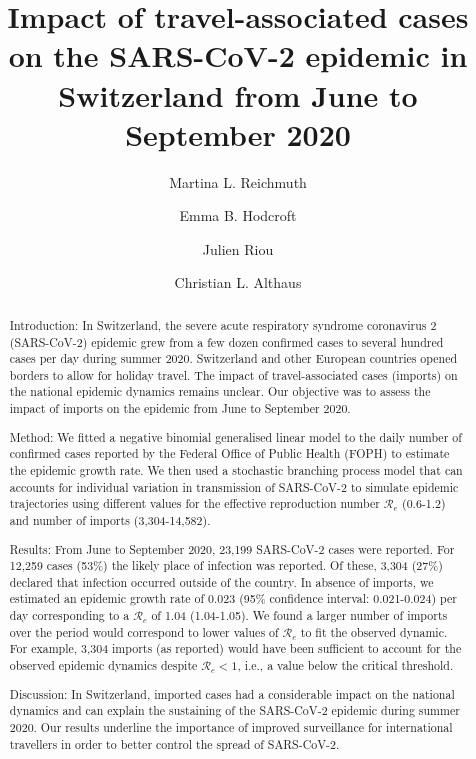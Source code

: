 \documentclass[10pt, a4paper, twoside]{article}
\title{Impact of travel-associated cases on the SARS-CoV-2 epidemic in Switzerland from June to September 2020}
\author[1]{Martina L. Reichmuth}
\author[1]{Emma B. Hodcroft}
\author[1,2]{Julien Riou}
\author[1*]{Christian L. Althaus}
\affil[1]{Institute of Social and Preventive Medicine, University of Bern, Bern, Switzerland}
\affil[1]{Federal Office of Public Health, Liebefeld, Switzerland}
\affil[*]{Correspondence: christian.althaus@ispm.unibe.ch}
\date{}
\begin{document}
\maketitle
\begin{abstract}
\noindent 

Introduction: In Switzerland, the severe acute respiratory syndrome coronavirus 2 (SARS-CoV-2) epidemic grew from a few dozen confirmed cases to several hundred cases per day during summer 2020. 
Switzerland and other European countries opened borders to allow for holiday travel. 
The impact of travel-associated cases (imports) on the national epidemic dynamics remains unclear. 
Our objective was to assess the impact of imports on the epidemic from June to September 2020.

Method: We fitted a negative binomial generalised linear model to the daily number of confirmed cases reported by the Federal Office of Public Health (FOPH) to estimate the epidemic growth rate. 
We then used a stochastic branching process model that can accounts for individual variation in transmission of SARS-CoV-2 to simulate epidemic trajectories using different values for the effective reproduction number $\mathcal{R}_e$ (0.6-1.2) and number of imports (3,304-14,582).

Results: From June to September 2020, 23,199 SARS-CoV-2 cases were reported. 
For 12,259 cases (53\%) the likely place of infection was reported. 
Of these, 3,304 (27\%) declared that infection occurred outside of the country.
In absence of imports, we estimated an epidemic growth rate of 0.023 (95\% confidence interval: 0.021-0.024) per day corresponding to a $\mathcal{R}_e$ of 1.04 (1.04-1.05). 
We found a larger number of imports over the period would correspond to lower values of $\mathcal{R}_e$ to fit the observed dynamic. 
For example, 3,304 imports (as reported) would have been sufficient to account for the observed epidemic dynamics despite $\mathcal{R}_e < 1$, i.e., a value below the critical threshold.

Discussion: 
In Switzerland, imported cases had a considerable impact on the national dynamics and can explain the sustaining of the SARS-CoV-2 epidemic during summer 2020. 
Our results underline the importance of improved surveillance for international travellers in order to better control the spread of SARS-CoV-2.
\clearpage
\end{abstract}
\end{document}
